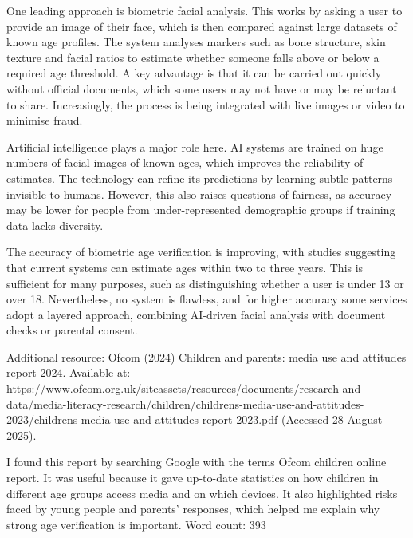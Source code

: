 \documentclass{tufte-handout}
\begin{document}
\begin{question}
One leading approach is biometric facial analysis. This works by asking a 
user to provide an image of their face, which is then compared against large datasets of known age 
profiles. The system analyses markers such as bone structure, skin texture and facial ratios to 
estimate whether someone falls above or below a required age threshold. A key advantage is that it 
can be carried out quickly without official documents, which some users may not have or may be 
reluctant to share. Increasingly, the process is being integrated with live images or video to minimise fraud.

Artificial intelligence plays a major role here. AI systems are trained on huge numbers of facial 
images of known ages, which improves the reliability of estimates. The technology can refine 
its predictions by learning subtle patterns invisible to humans. However, this also raises 
questions of fairness, as accuracy may be lower for people from under-represented demographic 
groups if training data lacks diversity.

The accuracy of biometric age verification is improving, with studies suggesting that current 
systems can estimate ages within two to three years. This is sufficient for many purposes, 
such as distinguishing whether a user is under 13 or over 18. Nevertheless, no system is flawless, 
and for higher accuracy some services adopt a layered approach, combining AI-driven facial 
analysis with document checks or parental consent.

\qsubpart

Additional resource:
Ofcom (2024) Children and parents: media use and attitudes report 2024. 
Available at: https://www.ofcom.org.uk/siteassets/resources/documents/research-and-data/media-literacy-research/children/childrens-media-use-and-attitudes-2023/childrens-media-use-and-attitudes-report-2023.pdf 
(Accessed 28 August 2025).

I found this report by searching Google with the terms Ofcom children online report. It was useful because it gave up-to-date statistics on how children in different age groups access media and on which devices. It also highlighted risks faced by young people and parents’ responses, which helped me explain why strong age verification is important.
Word count: 393

\end{question}
\end{document}

